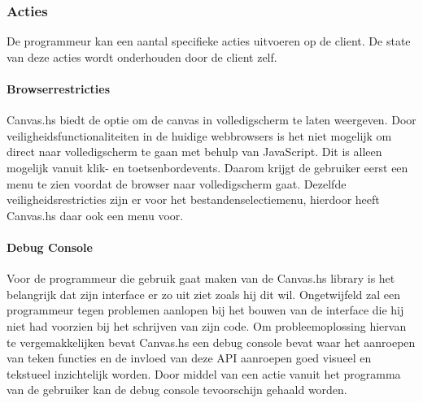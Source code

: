 \subsubsection{Acties}
De programmeur kan een aantal specifieke acties uitvoeren op de client. De state van deze acties wordt onderhouden door de client zelf.

\paragraph{Browserrestricties}
Canvas.hs biedt de optie om de canvas in volledigscherm te laten weergeven. Door veiligheidsfunctionaliteiten in de huidige webbrowsers is het niet mogelijk om direct naar volledigscherm te gaan met behulp van JavaScript. Dit is alleen mogelijk vanuit klik- en toetsenbordevents. Daarom krijgt de gebruiker eerst een menu te zien voordat de browser naar volledigscherm gaat. Dezelfde veiligheidsrestricties zijn er voor het bestandenselectiemenu, hierdoor heeft Canvas.hs daar ook een menu voor.


\paragraph{Debug Console}
Voor de programmeur die gebruik gaat maken van de Canvas.hs library is het belangrijk dat zijn interface er zo uit ziet zoals hij dit wil. Ongetwijfeld zal een programmeur tegen problemen aanlopen bij het bouwen van de interface die hij niet had voorzien bij het schrijven van zijn code. Om probleemoplossing hiervan te vergemakkelijken bevat Canvas.hs een debug console bevat waar het aanroepen van teken functies en de invloed van deze API aanroepen goed visueel en tekstueel inzichtelijk worden. Door middel van een actie vanuit het programma van de gebruiker kan de debug console tevoorschijn gehaald worden.